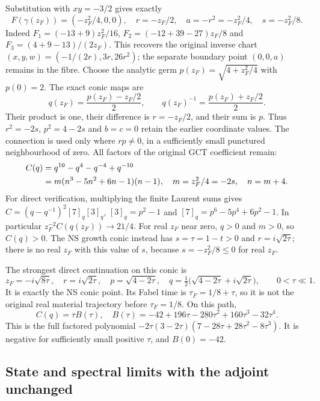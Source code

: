 Substitution with $xy=-3/2$ gives exactly
\[
 F(\gamma(z_F))=(-z_F^2/4,0,0),\quad
 r=-z_F/2,\quad a=-r^2=-z_F^2/4,\quad s=-z_F^2/8 .
\]
Indeed $F_1=(-13+9)z_F^2/16$,
$F_2=(-12+39-27)z_F/8$ and
$F_3=(4+9-13)/(2z_F)$. This recovers the original inverse chart
$(x,y,w)=(-1/(2r),3r,26r^2)$; the separate boundary point
$(0,0,a)$ remains in the fibre. Choose the analytic germ
$p(z_F)=\sqrt{4+z_F^2/4}$ with $p(0)=2$. The exact conic maps are
\begin{equation}\label{eq:ym-germ-conic}
 q(z_F)=\frac{p(z_F)-z_F/2}{2},\qquad
 q(z_F)^{-1}=\frac{p(z_F)+z_F/2}{2}.
\end{equation}
Their product is one, their difference is $r=-z_F/2$, and their
sum is $p$. Thus $r^2=-2s$, $p^2=4-2s$ and $b=c=0$ retain the
earlier coordinate values. The connection is used only where
$rp\ne0$, in a sufficiently small punctured neighbourhood of zero.
All factors of the original GCT coefficient remain:
\begin{align}
 C(q)&=q^{10}-q^4-q^{-4}+q^{-10}\notag\\
 &=m(n^3-5n^2+6n-1)(n-1),\quad
 m=z_F^2/4=-2s,\quad n=m+4 .\label{eq:ym-coefficient-base}
\end{align}
For direct verification, multiplying the finite Laurent sums gives
$C=(q-q^{-1})^2[7]_q[3]_q$,
$[3]_q=p^2-1$ and $[7]_q=p^6-5p^4+6p^2-1$.
In particular $z_F^{-2}C(q(z_F))\to21/4$.
For real $z_F$ near zero, $q>0$ and $m>0$, so $C(q)>0$.
The NS growth conic instead has $s=\tau=1-t>0$ and
$r=i\sqrt{2\tau}$; there is no real $z_F$ with this value of $s$,
because $s=-z_F^2/8\le0$ for real $z_F$.

The strongest direct continuation on this conic is
\begin{equation}\label{eq:ym-complex-path}
 z_F=-i\sqrt{8\tau},\quad r=i\sqrt{2\tau},\quad
 p=\sqrt{4-2\tau},\quad
 q=\tfrac12\bigl(\sqrt{4-2\tau}+i\sqrt{2\tau}\bigr),
 \qquad 0<\tau\ll1 .
\end{equation}
It is exactly the NS conic point. Its Fabel time is
$\tau_F=1/8+\tau$, so it is not the original real material
trajectory before $\tau_F=1/8$. On this path,
\[
 C(q)=\tau B(\tau),\quad
 B(\tau)=-42+196\tau-280\tau^2+160\tau^3-32\tau^4 .
\]
This is the full factored polynomial
$-2\tau(3-2\tau)(7-28\tau+28\tau^2-8\tau^3)$.
It is negative for sufficiently small positive $\tau$, and
$B(0)=-42$.

\subsection{State and spectral limits with the adjoint unchanged}

